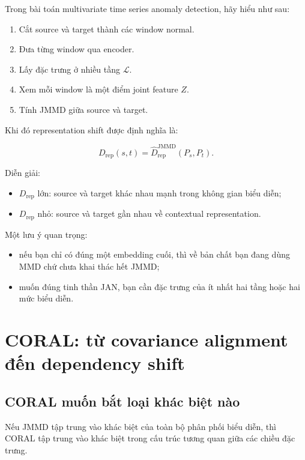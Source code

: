 \documentclass[a4paper]{article}
\begin{document}
Trong bài toán multivariate time series anomaly detection, hãy hiểu như sau:

\begin{enumerate}[label=\arabic*.]
    \item Cắt source và target thành các window normal.
    \item Đưa từng window qua encoder.
    \item Lấy đặc trưng ở nhiều tầng $\mathcal{L}$.
    \item Xem mỗi window là một điểm joint feature $Z$.
    \item Tính JMMD giữa source và target.
\end{enumerate}

Khi đó representation shift được định nghĩa là:

\[
D_{\mathrm{rep}}(s,t) = \widehat D_{\mathrm{rep}}^{\mathrm{JMMD}}(P_s, P_t).
\]

Diễn giải:

\begin{itemize}
    \item $D_{\mathrm{rep}}$ lớn: source và target khác nhau mạnh trong không gian biểu diễn;
    \item $D_{\mathrm{rep}}$ nhỏ: source và target gần nhau về contextual representation.
\end{itemize}

Một lưu ý quan trọng:

\begin{itemize}
    \item nếu bạn chỉ có đúng một embedding cuối, thì về bản chất bạn đang dùng MMD chứ chưa khai thác hết JMMD;
    \item muốn đúng tinh thần JAN, bạn cần đặc trưng của ít nhất hai tầng hoặc hai mức biểu diễn.
\end{itemize}

\section{CORAL: từ covariance alignment đến dependency shift}

\subsection{CORAL muốn bắt loại khác biệt nào}

Nếu JMMD tập trung vào khác biệt của toàn bộ phân phối biểu diễn, thì CORAL tập trung vào khác biệt trong cấu trúc tương quan giữa các chiều đặc trưng.
\end{document}
